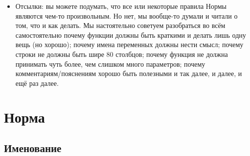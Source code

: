\documentclass{42-ru}
\begin{document}
\begin{itemize}
        \item Отсылки: вы можете подумать, что все или некоторые правила Нормы являются чем-то произвольным.
            Но нет, мы вообще-то думали и читали о том, что и как делать. Мы настоятельно советуем разобраться
            во всём самостоятельно почему функции должны быть краткими и делать лишь одну вещь (но хорошо);
            почему имена переменных должны нести смысл; почему строки не должны быть шире 80 столбцов;
            почему функция не должна принимать чуть более, чем слишком много параметров; почему
            комментариям/пояснениям хорошо быть полезными и так далее, и далее, и ещё раз далее.

    \end{itemize}

    \newpage


\chapter{Норма}


    \section{Именование}
\end{document}
